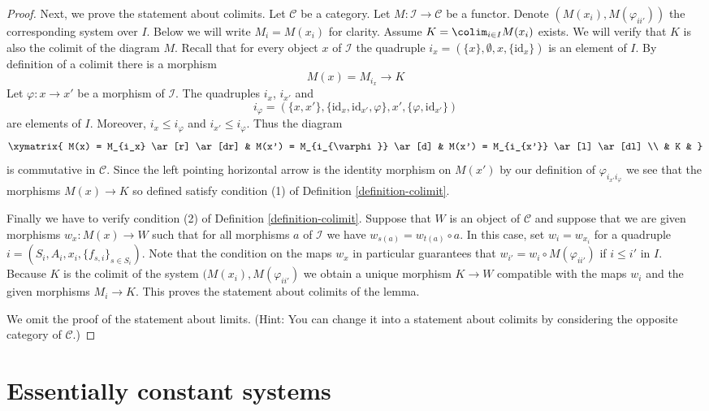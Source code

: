 \begin{proof}
\medskip\noindent
Next, we prove the statement about colimits.
Let $\mathcal{C}$ be a category.
Let $M : \mathcal{I} \to \mathcal{C}$ be a functor.
Denote $(M(x_i), M(\varphi_{ii'}))$ the corresponding system over $I$.
Below we will write $M_i = M(x_i)$ for clarity.
Assume $K = \colim_{i \in I} M(x_i)$ exists.
We will verify that $K$ is also the colimit of the diagram $M$.
Recall that for every object $x$ of $\mathcal{I}$ the
quadruple $i_x = (\{x\}, \emptyset, x, \{\text{id}_x\})$ is an
element of $I$. By definition of a colimit there is a morphism
$$
M(x) = M_{i_x} \longrightarrow K
$$
Let $\varphi : x \to x'$ be a morphism of $\mathcal{I}$.
The quadruples $i_x$, $i_{x'}$ and
$$
i_{\varphi}
=
(\{x, x'\},
\{\text{id}_x, \text{id}_{x'}, \varphi\},
x',
\{\varphi, \text{id}_{x'}\})
$$
are elements of $I$. Moreover, $i_x \leq i_{\varphi}$ and
$i_{x'} \leq i_{\varphi}$. Thus the diagram
$$
\xymatrix{
M(x) = M_{i_x} \ar[r] \ar[dr] &
M(x') = M_{i_{\varphi}} \ar[d] &
M(x') = M_{i_{x'}} \ar[l] \ar[dl] \\
& K &
}
$$
is commutative in $\mathcal{C}$.
Since the left pointing horizontal arrow is the identity morphism
on $M(x')$ by our definition of $\varphi_{i_{x'}i_{\varphi}}$
we see that the morphisms $M(x) \to K$ so defined satisfy
condition (1) of Definition \ref{definition-colimit}.

\medskip\noindent
Finally we have to verify condition (2) of Definition \ref{definition-colimit}.
Suppose that $W$ is an object of $\mathcal{C}$ and suppose that we are
given morphisms $w_x : M(x) \to W$ such that for all morphisms
$a$ of $\mathcal{I}$ we have $w_{s(a)} = w_{t(a)} \circ a$.
In this case, set $w_i = w_{x_i}$ for a quadruple
$i = (S_i, A_i, x_i, \{f_{s, i}\}_{s \in S_i})$. Note that the
condition on the maps $w_x$ in particular guarantees that
$w_{i'} = w_i \circ M(\varphi_{ii'})$ if $i \leq i'$ in $I$.
Because $K$ is the
colimit of the system $(M(x_i), M(\varphi_{ii'})$ we obtain a
unique morphism $K \to W$ compatible with the maps $w_i$
and the given morphisms $M_i \to K$. This proves the statement about
colimits of the lemma.

\medskip\noindent
We omit the proof of the statement about limits.
(Hint: You can change it into a statement about colimits
by considering the opposite category of $\mathcal{C}$.)
\end{proof}





\section{Essentially constant systems}
\label{section-essentially-constant}


